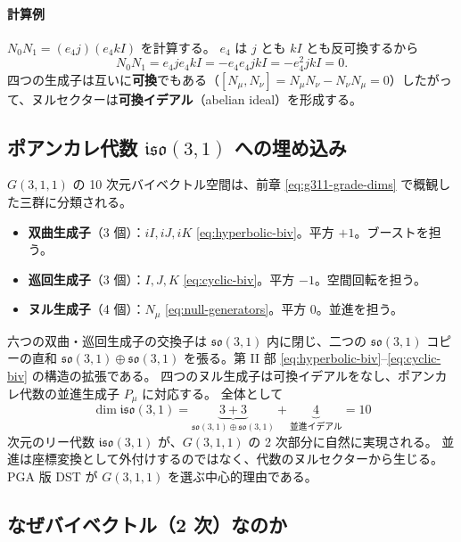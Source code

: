 \documentclass[dvipdfmx,a4paper,oneside]{jsbook}
\numberwithin{equation}{chapter}
\begin{document}
\paragraph{計算例}
\(N_0 N_1 = (e_4 j)(e_4 kI)\) を計算する。
\(e_4\) は \(j\) とも \(kI\) とも反可換するから
\[
  N_0 N_1 = e_4 j e_4 kI = -e_4 e_4 j kI = -e_4^2 j kI = 0.
\]
四つの生成子は互いに\textbf{可換}でもある（\([N_\mu, N_\nu] = N_\mu N_\nu - N_\nu N_\mu = 0\)）したがって、ヌルセクターは\textbf{可換イデアル}（abelian ideal）を形成する。

\subsection{ポアンカレ代数 \(\mathfrak{iso}(3,1)\) への埋め込み}

\(G(3,1,1)\) の 10 次元バイベクトル空間は、前章 \eqref{eq:g311-grade-dims} で概観した三群に分類される。

\begin{itemize}[leftmargin=2em]
  \item \textbf{双曲生成子}（3 個）：\(iI, iJ, iK\) \eqref{eq:hyperbolic-biv}。平方 \(+1\)。ブーストを担う。
  \item \textbf{巡回生成子}（3 個）：\(I, J, K\) \eqref{eq:cyclic-biv}。平方 \(-1\)。空間回転を担う。
  \item \textbf{ヌル生成子}（4 個）：\(N_\mu\) \eqref{eq:null-generators}。平方 \(0\)。並進を担う。
\end{itemize}

六つの双曲・巡回生成子の交換子は \(\mathfrak{so}(3,1)\) 内に閉じ、二つの \(\mathfrak{so}(3,1)\) コピーの直和 \(\mathfrak{so}(3,1) \oplus \mathfrak{so}(3,1)\) を張る。第 II 部 \eqref{eq:hyperbolic-biv}–\eqref{eq:cyclic-biv} の構造の拡張である。
四つのヌル生成子は可換イデアルをなし、ポアンカレ代数の並進生成子 \(P_\mu\) に対応する。
全体として
\begin{equation}
  \dim \mathfrak{iso}(3,1)
  = \underbrace{3 + 3}_{\mathfrak{so}(3,1) \oplus \mathfrak{so}(3,1)}
  + \underbrace{4}_{\text{並進イデアル}}
  = 10
  \label{eq:poincare-iso}
\end{equation}
次元のリー代数 \(\mathfrak{iso}(3,1)\) が、\(G(3,1,1)\) の 2 次部分に自然に実現される。
並進は座標変換として外付けするのではなく、代数のヌルセクターから生じる。PGA 版 DST が \(G(3,1,1)\) を選ぶ中心的理由である。

\subsection{なぜバイベクトル（2 次）なのか}
\end{document}
